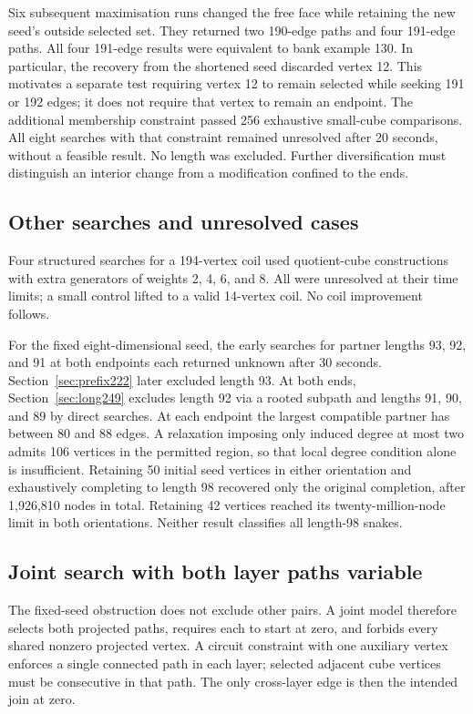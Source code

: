 \documentclass[11pt,a4paper]{article}
\theoremstyle{definition}
\theoremstyle{remark}
\begin{document}
Six subsequent maximisation runs changed the free face while retaining the new seed's outside selected set. They returned two 190-edge paths and four 191-edge paths. All four 191-edge results were equivalent to bank example 130. In particular, the recovery from the shortened seed discarded vertex 12. This motivates a separate test requiring vertex 12 to remain selected while seeking 191 or 192 edges; it does not require that vertex to remain an endpoint. The additional membership constraint passed 256 exhaustive small-cube comparisons. All eight searches with that constraint remained unresolved after 20 seconds, without a feasible result. No length was excluded. Further diversification must distinguish an interior change from a modification confined to the ends.

\subsection{Other searches and unresolved cases}
Four structured searches for a 194-vertex coil used quotient-cube constructions with extra generators of weights 2, 4, 6, and 8. All were unresolved at their time limits; a small control lifted to a valid 14-vertex coil. No coil improvement follows.

For the fixed eight-dimensional seed, the early searches for partner lengths 93, 92, and 91 at both endpoints each returned unknown after 30 seconds. Section~\ref{sec:prefix222} later excluded length 93. At both ends, Section~\ref{sec:long249} excludes length 92 via a rooted subpath and lengths 91, 90, and 89 by direct searches. At each endpoint the largest compatible partner has between 80 and 88 edges. A relaxation imposing only induced degree at most two admits 106 vertices in the permitted region, so that local degree condition alone is insufficient. Retaining 50 initial seed vertices in either orientation and exhaustively completing to length 98 recovered only the original completion, after 1,926,810 nodes in total. Retaining 42 vertices reached its twenty-million-node limit in both orientations. Neither result classifies all length-98 snakes.

\subsection{Joint search with both layer paths variable}
The fixed-seed obstruction does not exclude other pairs. A joint model therefore selects both projected paths, requires each to start at zero, and forbids every shared nonzero projected vertex. A circuit constraint with one auxiliary vertex enforces a single connected path in each layer; selected adjacent cube vertices must be consecutive in that path. The only cross-layer edge is then the intended join at zero.
\end{document}
